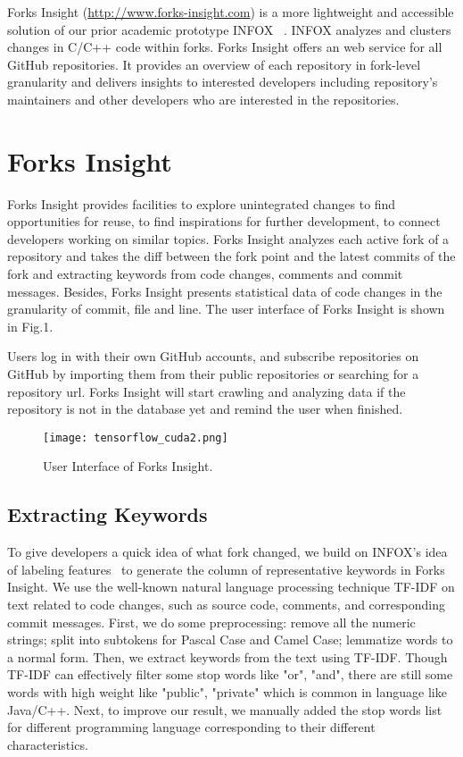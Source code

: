 Forks Insight (\url{http://www.forks-insight.com}) is a more lightweight and accessible solution of our prior academic prototype INFOX ~\cite{ZSLXWK:ICSE18}. INFOX analyzes and clusters changes in C/C++ code within forks. Forks Insight offers an web service for all GitHub repositories. It provides an overview of each repository in fork-level granularity and delivers insights to interested developers including repository's maintainers and other developers who are interested in the repositories.

\section{Forks Insight}

Forks Insight provides facilities to explore unintegrated changes to find opportunities for reuse, to find inspirations for further development, to connect developers working on similar topics.
%
Forks Insight analyzes each active fork of a repository and takes the diff between the fork point and the latest commits   of the fork and extracting keywords from code changes, comments and commit messages.
%
Besides, Forks Insight presents statistical data of code changes in the granularity of commit, file and line. The user interface of Forks Insight is shown in Fig.1. 

Users log in with their own GitHub accounts, and subscribe repositories on GitHub by importing them from their public repositories or searching for a repository url. Forks Insight will start crawling and analyzing data if the repository is not in the database yet and remind the user when finished.

\begin{figure*}[ht]
\texttt{[image: tensorflow\_cuda2.png]}
\caption{User Interface of Forks Insight.}
\vspace{-6pt}
\label{GUI}
\end{figure*}

\subsection{Extracting Keywords}
To give developers a quick idea of what fork changed, we build on INFOX's idea of labeling features~\cite{ZSLXWK:ICSE18}
to generate the column of representative keywords in Forks Insight. We use the well-known natural language processing technique TF-IDF \cite{salton1988term} on text related to code changes, such as source code, comments, and corresponding commit messages. First, we do some preprocessing: remove all the numeric strings; split into subtokens for Pascal Case and Camel Case; lemmatize words to a normal form. Then, we extract keywords from the text using TF-IDF. Though TF-IDF can effectively filter some stop words like "or", "and", there are still some words with high weight like "public", "private" which is common in language like Java/C++. Next, to improve our result, we manually added the stop words list for different programming language corresponding to their different characteristics. 

